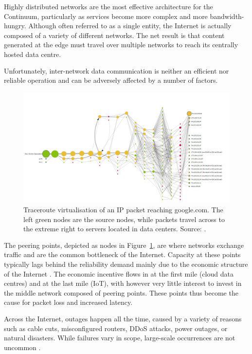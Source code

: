 Highly distributed networks are the most effective architecture for the Continuum, particularly as services become more complex and more bandwidth-hungry. Although often referred to as a single entity, the Internet is actually composed of a variety of different networks. The net result is that content generated at the edge must travel over multiple networks to reach its centrally hosted data centre.

Unfortunately, inter-network data communication is neither an efficient nor reliable operation and can be adversely affected by a number of factors.

\begin{figure}[ht]
\centering
\includegraphics[width=\columnwidth]{figures/traceroute}
\caption{Traceroute virtualisation of an IP packet reaching google.com. The left green nodes are the source nodes, while packets travel across to the extreme right to servers located in data centers. Source: \cite{traceroute-google}.}
\label{fig:traceroute}
\end{figure}

The peering points, depicted as nodes in Figure~\ref{fig:traceroute}, are where networks exchange traffic and are the common bottleneck of the Internet. Capacity at these points typically lags behind the reliability demand mainly due to the economic structure of the Internet \cite{nygren2010akamai}. The economic incentive flows in at the first mile (cloud data centres) and at the last mile (IoT), with however very little interest to invest in the middle network composed of peering points. These points thus become the cause for packet loss and increased latency.

Across the Internet, outages happen all the time, caused by a variety of reasons such as cable cuts, misconfigured routers, DDoS attacks, power outages, or natural disasters. While failures vary in scope, large-scale occurrences are not uncommon \cite{aws-outage}.

